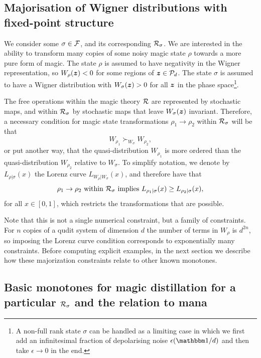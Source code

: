 \documentclass[pra,
aps,
twocolumn,
superscriptaddress,
groupedaddress,
nofootinbib,
reprint
]{revtex4-1}
\begin{document}
\subsection{Majorisation of Wigner distributions with fixed-point structure}
\label{sec:major_frag}
We consider some $\sigma \in {\mathcal F}$, and its corresponding ${\mathcal R}_\sigma$. We are interested in the ability to transform many copies of some noisy magic state $\rho$ towards a more pure form of magic. The state $\rho$ is assumed to have negativity in the Wigner representation, so $W_\rho(\bm{z}) < 0$ for some regions of $\bm{z} \in {\mathcal P}_d$. The state $\sigma$ is assumed to have a Wigner distribution with $W_\sigma(\bm{z}) > 0$ for all $\bm{z}$ in the phase space\footnote{A non-full rank state $\sigma$ can be handled as a limiting case in which we first add an infinitesimal fraction of depolarising noise $\epsilon (\id/d)$ and then take $\epsilon \rightarrow 0$ in the end.}.

The free operations within the magic theory ${\mathcal R}$ are represented by stochastic maps, and within ${\mathcal R}_\sigma$ by stochastic maps that leave $W_\sigma(\bm{z})$ invariant. Therefore, a necessary condition for magic state transformations $\rho_1 \rightarrow \rho_2$ within ${\mathcal R}_\sigma$ will be that 
\begin{equation}
	W_{\rho_1} \succ_{W_{\sigma}} W_{\rho_2},
\end{equation}
or put another way, that the quasi-distribution $W_{\rho_1}$ is more ordered than the quasi-distribution $W_{\rho_2}$ relative to $W_\sigma$. To simplify notation, we denote by $L_{\rho | \sigma}(x)$ the Lorenz curve $L_{W_{\rho} | W_{\sigma}} (x)$, and therefore have that
\begin{equation}
\rho_1 \rightarrow \rho_2 \mbox{ within }{\mathcal R}_\sigma \mbox{ implies } L_{\rho_1 |\sigma} (x) \ge L_{\rho_2 |\sigma} (x),
\end{equation}
for all $x \in [0,1]$, which restricts the transformations that are possible.

Note that this is not a single numerical constraint, but a family of constraints. For $n$ copies of a qudit system of dimension $d$ the number of terms in $W_{\rho}$ is $d^{2n}$, so imposing the Lorenz curve condition corresponds to exponentially many constraints.  Before computing explicit examples, in the next section we describe how these majorization constraints relate to other known monotones.

\subsection{Basic monotones for magic distillation for a particular ${\mathcal R}_\sigma$ and the relation to mana}
\label{sec:monotones_frag}
\end{document}

